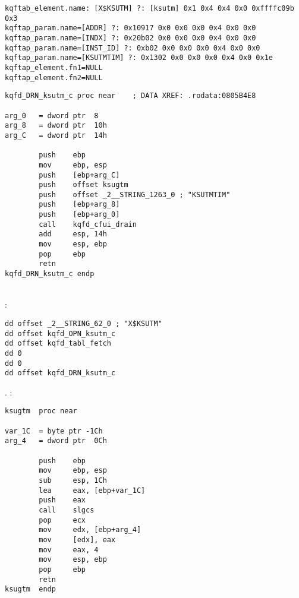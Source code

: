 \begin{lstlisting}[caption=\RU{Результат работы}\EN{Result of} \OracleTablesName]
kqftab_element.name: [X$KSUTM] ?: [ksutm] 0x1 0x4 0x4 0x0 0xffffc09b 0x3
kqftap_param.name=[ADDR] ?: 0x10917 0x0 0x0 0x0 0x4 0x0 0x0
kqftap_param.name=[INDX] ?: 0x20b02 0x0 0x0 0x0 0x4 0x0 0x0
kqftap_param.name=[INST_ID] ?: 0xb02 0x0 0x0 0x0 0x4 0x0 0x0
kqftap_param.name=[KSUTMTIM] ?: 0x1302 0x0 0x0 0x0 0x4 0x0 0x1e
kqftap_element.fn1=NULL
kqftap_element.fn2=NULL
\end{lstlisting}


\begin{lstlisting}
kqfd_DRN_ksutm_c proc near    ; DATA XREF: .rodata:0805B4E8

arg_0   = dword ptr  8
arg_8   = dword ptr  10h
arg_C   = dword ptr  14h

        push    ebp
        mov     ebp, esp
        push    [ebp+arg_C]
        push    offset ksugtm
        push    offset _2__STRING_1263_0 ; "KSUTMTIM"
        push    [ebp+arg_8]
        push    [ebp+arg_0]
        call    kqfd_cfui_drain
        add     esp, 14h
        mov     esp, ebp
        pop     ebp
        retn
kqfd_DRN_ksutm_c endp
\end{lstlisting}

   \\
 :

\begin{lstlisting}
dd offset _2__STRING_62_0 ; "X$KSUTM"
dd offset kqfd_OPN_ksutm_c
dd offset kqfd_tabl_fetch
dd 0
dd 0
dd offset kqfd_DRN_ksutm_c
\end{lstlisting}

.
:

\begin{lstlisting}[caption=ksu.o]
ksugtm  proc near

var_1C  = byte ptr -1Ch
arg_4   = dword ptr  0Ch

        push    ebp
        mov     ebp, esp
        sub     esp, 1Ch
        lea     eax, [ebp+var_1C]
        push    eax
        call    slgcs
        pop     ecx
        mov     edx, [ebp+arg_4]
        mov     [edx], eax
        mov     eax, 4
        mov     esp, ebp
        pop     ebp
        retn
ksugtm  endp
\end{lstlisting}

